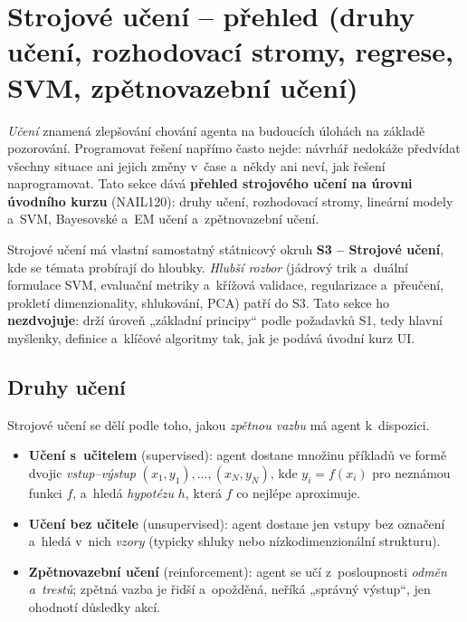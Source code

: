 \section{Strojové učení -- přehled (druhy učení, rozhodovací stromy, regrese, SVM, zpětnovazební učení)}

\emph{Učení} znamená zlepšování chování agenta na budoucích úlohách na základě pozorování. Programovat řešení napřímo často nejde: návrhář nedokáže předvídat všechny situace ani jejich změny v~čase a~někdy ani neví, jak řešení naprogramovat. Tato sekce dává \textbf{přehled strojového učení na úrovni úvodního kurzu} (NAIL120): druhy učení, rozhodovací stromy, lineární modely a~SVM, Bayesovské a~EM učení a~zpětnovazební učení.

\begin{poznamka}
Strojové učení má vlastní samostatný státnicový okruh \textbf{S3 -- Strojové učení}, kde se témata probírají do hloubky. \emph{Hlubší rozbor} (jádrový trik a~duální formulace SVM, evaluační metriky a~křížová validace, regularizace a~přeučení, prokletí dimenzionality, shlukování, PCA) patří do S3. Tato sekce ho \textbf{nezdvojuje}: drží úroveň „základní principy`` podle požadavků S1, tedy hlavní myšlenky, definice a~klíčové algoritmy tak, jak je podává úvodní kurz UI.
\end{poznamka}

\subsection{Druhy učení}

Strojové učení se dělí podle toho, jakou \emph{zpětnou vazbu} má agent k~dispozici.

\begin{definice}
\begin{itemize}
  \item \textbf{Učení s~učitelem} (supervised): agent dostane množinu příkladů ve formě dvojic \emph{vstup--výstup} $(x_1,y_1),\dots,(x_N,y_N)$, kde $y_i=f(x_i)$ pro neznámou funkci $f$, a~hledá \emph{hypotézu} $h$, která $f$ co nejlépe aproximuje.
  \item \textbf{Učení bez učitele} (unsupervised): agent dostane jen vstupy bez označení a~hledá v~nich \emph{vzory} (typicky shluky nebo nízkodimenzionální strukturu).
  \item \textbf{Zpětnovazební učení} (reinforcement): agent se učí z~posloupnosti \emph{odměn a~trestů}; zpětná vazba je řidší a~opožděná, neříká „správný výstup``, jen ohodnotí důsledky akcí.
\end{itemize}
\end{definice}

